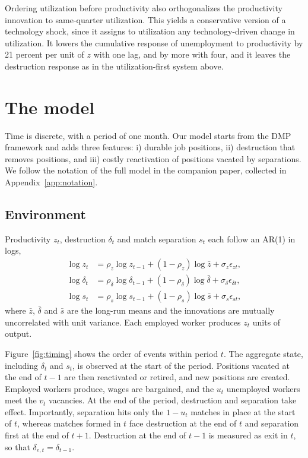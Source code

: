 \documentclass[authoryear, review, 12pt]{elsarticle}
\begin{document}
Ordering utilization before productivity also orthogonalizes the productivity innovation to same-quarter utilization. This yields a conservative version of a technology shock, since it assigns to utilization any technology-driven change in utilization. It lowers the cumulative response of unemployment to productivity by 21 percent per unit of $z$ with one lag, and by more with four, and it leaves the destruction response as in the utilization-first system above.

\section{The model}\label{sec:model}

Time is discrete, with a period of one month. Our model starts from the DMP framework and adds three features: i) durable job positions, ii) destruction that removes positions, and iii) costly reactivation of positions vacated by separations. We follow the notation of the full model in the companion paper, collected in Appendix~\ref{app:notation}.

\subsection{Environment}\label{sec:environment}

Productivity $z_t$, destruction $\delta_t$ and match separation $s_t$ each follow an AR(1) in logs,
\begin{align}
\log z_t &= \rho_z \log z_{t-1} + (1-\rho_z)\log\bar{z} + \sigma_z\epsilon_{zt}, \label{eq:ar1_z}\\
\log \delta_t &= \rho_\delta \log \delta_{t-1} + (1-\rho_\delta)\log\bar{\delta} + \sigma_\delta\epsilon_{\delta t}, \label{eq:ar1_delta}\\
\log s_t &= \rho_s \log s_{t-1} + (1-\rho_s)\log\bar{s} + \sigma_s\epsilon_{st}, \label{eq:ar1_s}
\end{align}
where $\bar z$, $\bar\delta$ and $\bar s$ are the long-run means and the innovations are mutually uncorrelated with unit variance. Each employed worker produces $z_t$ units of output.

Figure~\ref{fig:timing} shows the order of events within period $t$. The aggregate state, including $\delta_t$ and $s_t$, is observed at the start of the period. Positions vacated at the end of $t-1$ are then reactivated or retired, and new positions are created. Employed workers produce, wages are bargained, and the $u_t$ unemployed workers meet the $v_t$ vacancies. At the end of the period, destruction and separation take effect. Importantly, separation hits only the $1-u_t$ matches in place at the start of $t$, whereas matches formed in $t$ face destruction at the end of $t$ and separation first at the end of $t+1$. Destruction at the end of $t-1$ is measured as exit in $t$, so that $\delta_{e,t}=\delta_{t-1}$.
\end{document}
